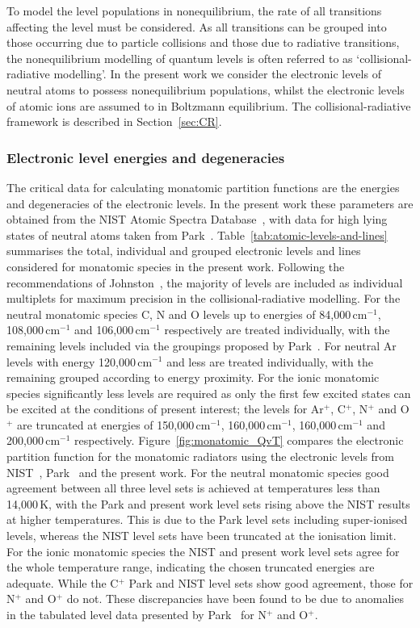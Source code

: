 To model the level populations in nonequilibrium, the rate of all transitions affecting the level must be considered.
As all transitions can be grouped into those occurring due to particle collisions and those due to radiative transitions, the nonequilibrium modelling of quantum levels is often referred to as `collisional-radiative modelling'.
In the present work we consider the electronic levels of neutral atoms to possess nonequilibrium populations, whilst the electronic levels of atomic ions are assumed to in Boltzmann equilibrium.
The collisional-radiative framework is described in Section~\ref{sec:CR}.

\subsubsection{Electronic level energies and degeneracies}

The critical data for calculating monatomic partition functions are the energies and degeneracies of the electronic levels.
In the present work these parameters are obtained from the NIST Atomic Spectra Database~\cite{NIST_ASD}, with data for high lying states of neutral atoms taken from Park~\cite{park_1990}.
Table~\ref{tab:atomic-levels-and-lines} summarises the total, individual and grouped electronic levels and lines considered for monatomic species in the present work.
Following the recommendations of Johnston~\cite{JohnPhd}, the majority of levels are included as individual multiplets for maximum precision in the collisional-radiative modelling.  
For the neutral monatomic species C, N and O levels up to energies of 84,000\,cm$^{-1}$, 108,000\,cm$^{-1}$ and 106,000\,cm$^{-1}$ respectively are treated individually, with the remaining levels included via the groupings proposed by Park~\cite{park_1990}.
For neutral Ar levels with energy 120,000\,cm$^{-1}$ and less are treated individually, with the remaining grouped according to energy proximity.
For the ionic monatomic species significantly less levels are required as only the first few excited states can be excited at the conditions of present interest; the levels for Ar$^+$, C$^+$, N$^+$ and O$^+$ are truncated at energies of 150,000\,cm$^{-1}$, 160,000\,cm$^{-1}$, 160,000\,cm$^{-1}$ and 200,000\,cm$^{-1}$ respectively.
Figure~\ref{fig:monatomic_QvT} compares the electronic partition function for the monatomic radiators using the electronic levels from NIST~\cite{NIST_ASD}, Park~\cite{park_1990} and the present work.
For the neutral monatomic species good agreement between all three level sets is achieved at temperatures less than 14,000\,K, with the Park and present work level sets rising above the NIST results at higher temperatures.
This is due to the Park level sets including super-ionised levels, whereas the NIST level sets have been truncated at the ionisation limit.
For the ionic monatomic species the NIST and present work level sets agree for the whole temperature range, indicating the chosen truncated energies are adequate.
While the C$^+$ Park and NIST level sets show good agreement, those for N$^+$ and O$^+$ do not.
These discrepancies have been found to be due to anomalies in the tabulated level data presented by Park~\cite{park_1990} for N$^+$ and O$^+$.

